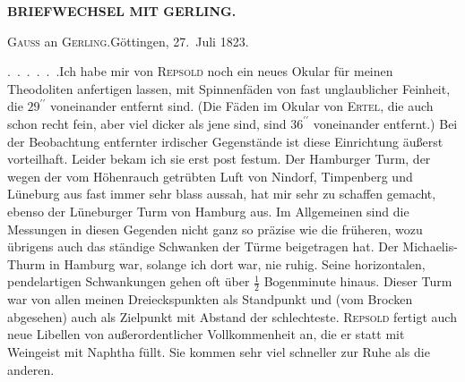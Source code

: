 \par\clearpage
\noindent{}\hfill{\small\textbf{BRIEFWECHSEL MIT GERLING.}}\hfill\null\par\medskip
\begin{center}
\textsc{Gauss} an \textsc{Gerling}.\quad Göttingen, 27.~Juli 1823.
\end{center}

\par\noindent\hspace*{\parindent}\mbox{.\ .\ .\ .\ .\ .}\quad Ich habe mir von \textsc{Repsold} noch ein neues Okular für meinen Theodoliten anfertigen lassen, mit Spinnenfäden von fast unglaublicher Feinheit, die \(29^{\prime\prime}\) voneinander entfernt sind.
(Die Fäden im Okular von \textsc{Ertel}, die auch schon recht fein, aber viel dicker als jene sind, sind \(36^{\prime\prime}\) voneinander entfernt.)
Bei der Beobachtung entfernter  irdischer Gegenstände ist diese Einrichtung äußerst vorteilhaft. Leider bekam ich sie erst post festum.
Der Hamburger Turm, der wegen der vom Höhenrauch getrübten Luft von Nindorf, Timpenberg und Lüneburg aus fast immer sehr blass aussah, hat mir sehr zu schaffen gemacht, ebenso der Lüneburger Turm von Hamburg aus. Im Allgemeinen sind die Messungen in diesen Gegenden nicht ganz so präzise wie die früheren, wozu übrigens auch das ständige Schwanken der Türme beigetragen hat.
Der Michaelis-Thurm in Hamburg war, solange ich dort war, nie ruhig. Seine horizontalen, pendelartigen Schwankungen gehen oft über \(\frac{1}{2}\) Bogenminute hinaus.
Dieser Turm war von allen meinen Dreieckspunkten als Standpunkt und (vom Brocken abgesehen) auch als Zielpunkt mit Abstand der schlechteste.
\textsc{Repsold} fertigt auch neue Libellen von außerordentlicher Vollkommenheit an, die er statt mit Weingeist mit Naphtha füllt.
Sie kommen sehr viel schneller zur Ruhe als die anderen.
